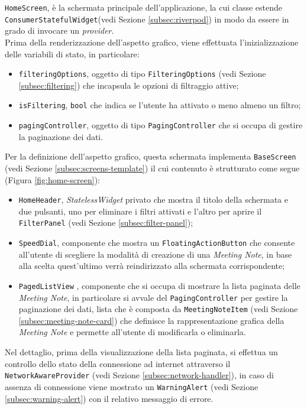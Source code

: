\lstinline{HomeScreen}, è la schermata principale dell'applicazione, la cui classe estende \lstinline{ConsumerStatefulWidget}(vedi Sezione \ref{subsec:riverpod}) in modo da essere in grado di invocare un \emph{provider}. \\
Prima della renderizzazione dell'aspetto grafico, viene effettuata l'inizializzazione delle variabili di stato, in particolare:
\begin{itemize}
    \item \lstinline{filteringOptions}, oggetto di tipo \lstinline{FilteringOptions} (vedi Sezione \ref{subsec:filtering}) che incapsula le opzioni di filtraggio attive;
    \item \lstinline{isFiltering}, \lstinline{bool} che indica se l'utente ha attivato o meno almeno un filtro;
    \item \lstinline{pagingController}, oggetto di tipo \lstinline{PagingController} \cite{site:infinite-scroll-pagination} che si occupa di gestire la paginazione dei dati.
\end{itemize}
Per la definizione dell'aspetto grafico, questa schermata implementa \lstinline{BaseScreen} (vedi Sezione \ref{subsec:screens-template}) il cui contenuto è strutturato come segue (Figura \ref{fig:home-screen}):
\begin{itemize}
    \item \lstinline{HomeHeader}, \emph{StatelessWidget} privato che mostra il titolo della schermata e due pulsanti, uno per eliminare i filtri attivati e l'altro per aprire il \lstinline{FilterPanel} (vedi Sezione \ref{subsec:filter-panel});
    \item \lstinline{SpeedDial}, componente che mostra un \lstinline{FloatingActionButton} \cite{site:fab} che consente all'utente di scegliere la modalità di creazione di una \emph{Meeting Note}, in base alla scelta quest'ultimo verrà reindirizzato alla schermata corrispondente;
    \item \lstinline{PagedListView} \cite{site:infinite-scroll-pagination}, componente che si occupa di mostrare la lista paginata delle \emph{Meeting Note}, in particolare si avvale del \lstinline{PagingController} per gestire la paginazione dei dati, lista che è composta da \lstinline{MeetingNoteItem} (vedi Sezione \ref{subsec:meeting-note-card}) che definisce la rappresentazione grafica della \emph{Meeting Note} e permette all'utente di modificarla o eliminarla.
\end{itemize}
Nel dettaglio, prima della visualizzazione della lista paginata, si effettua un controllo dello stato della connessione ad internet attraverso il \lstinline{NetworkAwareProvider} (vedi Sezione \ref{subsec:network-handler}), in caso di assenza di connessione viene mostrato un \lstinline{WarningAlert} (vedi Sezione \ref{subsec:warning-alert}) con il relativo messaggio di errore. \\
